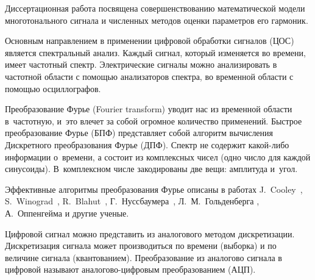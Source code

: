 {\actuality} 
Диссертационная работа посвящена совершенствованию математической модели многотонального сигнала и численных методов оценки параметров его гармоник. 

Основным направлением в применении цифровой обработки сигналов (ЦОС) является спектральный анализ. Каждый сигнал, который изменяется во времени, имеет частотный спектр. Электрические сигналы можно анализировать в частотной области с помощью анализаторов спектра, во временной области с помощью осциллографов. 

Преобразование Фурье (Fourier transform) уводит нас из временной области в частотную, и это влечет за собой огромное количество применений. Быстрое преобразование
Фурье (БПФ) представляет собой алгоритм вычисления Дискретного преобразования Фурье (ДПФ). Спектр не содержит какой-либо информации о времени, а состоит из комплексных чисел (одно число для каждой синусоиды). В комплексном числе закодированы две вещи: амплитуда и угол. 

Эффективные алгоритмы преобразования Фурье описаны в работах J.~Cooley~\cite{cooley1965algorithm}, S.~Winograd~\cite{winograd1978computing}, R.~Blahut~\cite{1457487}, Г.~Нуссбаумера~\cite{nussbaumer1985fast}, Л.~М.~Гольденберга \cite{Digital_processing_Goldenberg_1985}, А.~Оппенгейма \cite{Oppenheim2018Digital} и другие ученые. 







Цифровой сигнал можно представить из аналогового методом дискретизации. Дискретизация сигнала может производиться по времени (выборка) и по величине сигнала (квантованием). Преобразование из аналогово сигнала в цифровой называют аналогово-цифровым преобразованием (АЦП). 


